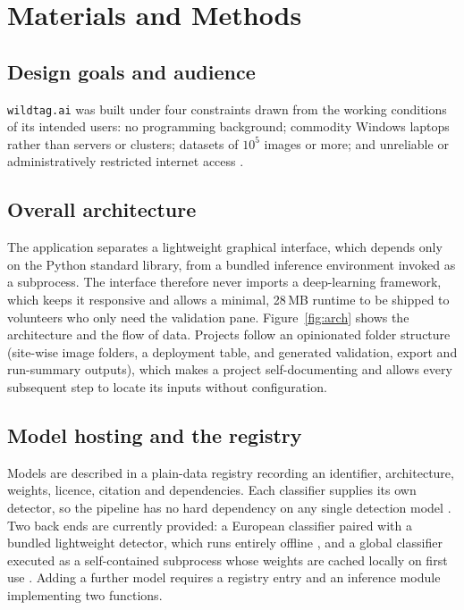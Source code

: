 \documentclass[11pt]{article}
\begin{document}
\section{Materials and Methods}

\subsection{Design goals and audience}
\texttt{wildtag.ai} was built under four constraints drawn from the working
conditions of its intended users: no programming background; commodity Windows
laptops rather than servers or clusters; datasets of $10^{5}$ images or more;
and unreliable or administratively restricted internet access \cw.

\subsection{Overall architecture}
The application separates a lightweight graphical interface, which depends only
on the Python standard library, from a bundled inference environment invoked as
a subprocess. The interface therefore never imports a deep-learning framework,
which keeps it responsive and allows a minimal, 28\,MB runtime to be shipped to
volunteers who only need the validation pane. Figure~\ref{fig:arch} shows the
architecture and the flow of data. Projects follow an opinionated folder
structure (site-wise image folders, a deployment table, and generated validation,
export and run-summary outputs), which makes a project self-documenting and
allows every subsequent step to locate its inputs without configuration.

\subsection{Model hosting and the registry}
Models are described in a plain-data registry recording an identifier,
architecture, weights, licence, citation and dependencies. Each classifier
supplies its own detector, so the pipeline has no hard dependency on any single
detection model \cw. Two back ends are currently provided: a European classifier
paired with a bundled lightweight detector, which runs entirely offline \cw, and
a global classifier executed as a self-contained subprocess whose weights are
cached locally on first use \cw. Adding a further model requires a registry entry
and an inference module implementing two functions.
\end{document}
